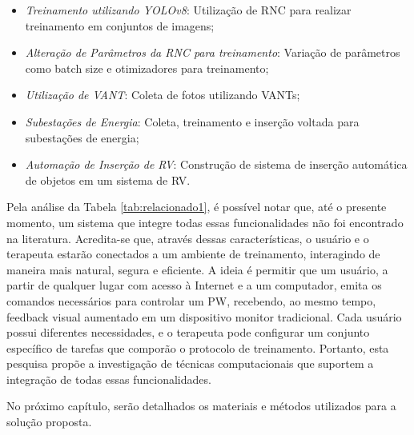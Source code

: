 \begin{itemize}
    \item \textit{Treinamento utilizando YOLOv8}: Utilização de RNC para realizar treinamento em conjuntos de imagens;
    \item \textit{Alteração de Parâmetros da RNC para treinamento}: Variação de parâmetros como batch size e otimizadores para treinamento;
    \item \textit{Utilização de VANT}: Coleta de fotos utilizando VANTs;
    \item \textit{Subestações de Energia}: Coleta, treinamento e inserção voltada para subestações de energia;
    \item \textit{Automação de Inserção de RV}: Construção de sistema de inserção automática de objetos em um sistema de RV.
\end{itemize}

Pela análise da Tabela \ref{tab:relacionado1}, é possível notar que, até o presente momento, um sistema que integre todas essas funcionalidades não foi encontrado na literatura. Acredita-se que, através dessas características, o usuário e o terapeuta estarão conectados a um ambiente de treinamento, interagindo de maneira mais natural, segura e eficiente. A ideia é permitir que um usuário, a partir de qualquer lugar com acesso à Internet e a um computador, emita os comandos necessários para controlar um PW, recebendo, ao mesmo tempo, feedback visual aumentado em um dispositivo monitor tradicional. Cada usuário possui diferentes necessidades, e o terapeuta pode configurar um conjunto específico de tarefas que comporão o protocolo de treinamento. Portanto, esta pesquisa propõe a investigação de técnicas computacionais que suportem a integração de todas essas funcionalidades.

No próximo capítulo, serão detalhados os materiais e métodos utilizados para a solução proposta.




